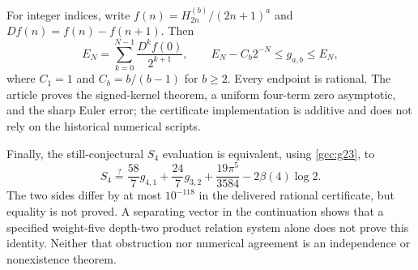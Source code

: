 For integer indices, write $f(n)=H_{2n}^{(b)}/(2n+1)^a$ and
$Df(n)=f(n)-f(n+1)$. Then
\[
 E_N=\sum_{k=0}^{N-1}\frac{D^kf(0)}{2^{k+1}},\qquad
 E_N-C_b2^{-N}\le g_{a,b}\le E_N,
\]
where $C_1=1$ and $C_b=b/(b-1)$ for $b\ge2$. Every endpoint is rational.
The article proves the signed-kernel theorem, a uniform four-term zero
asymptotic, and the sharp Euler error; the certificate implementation is
additive and does not rely on the historical numerical scripts.

Finally, the still-conjectural $S_4$ evaluation is equivalent, using
\eqref{gcc:g23}, to
\[
 S_4\stackrel{?}{=}\frac{58}{7}g_{4,1}+\frac{24}{7}g_{3,2}
                  +\frac{19\pi^5}{3584}-2\beta(4)\log2.
\]
The two sides differ by at most $10^{-118}$ in the delivered rational
certificate, but equality is not proved. A separating vector in the
continuation shows that a specified weight-five depth-two product relation
system alone does not prove this identity. Neither that obstruction nor
numerical agreement is an independence or nonexistence theorem.
